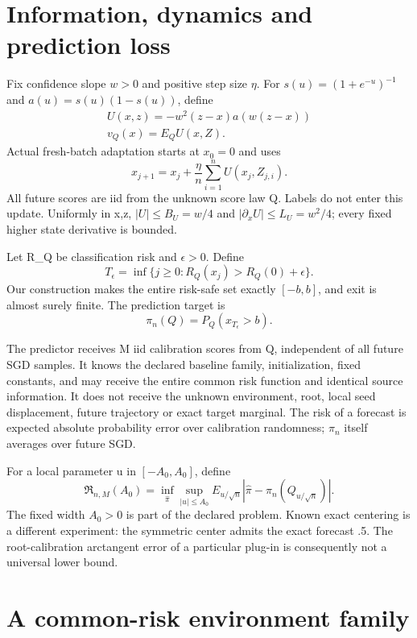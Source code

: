 \section{Information, dynamics and prediction loss}\label{information-dynamics-and-prediction-loss}

Fix confidence slope \(w>0\) and positive step size \(\eta\). For \(s(u)=(1+e^{-u})^{-1}\) and \(a(u)=s(u)(1-s(u))\), define
\[
\begin{gathered}
U(x,z)=-w^2(z-x)a(w(z-x)) \\
v_Q(x)=E_Q U(x,Z).
\end{gathered}
\]
Actual fresh-batch adaptation starts at \(x_0=0\) and uses
\[
x_{j+1}=x_j+\frac\eta n\sum_{i=1}^n U(x_j,Z_{j,i}).
\]
All future scores are iid from the unknown score law Q. Labels do not enter this update. Uniformly in x,z, \(|U|\le B_U=w/4\) and \(|\partial_x U|\le L_U=w^2/4\); every fixed higher state derivative is bounded.

Let R\_Q be classification risk and \(\epsilon>0\). Define
\[
T_\epsilon=\inf\{j\ge0:R_Q(x_j)>R_Q(0)+\epsilon\}.
\]
Our construction makes the entire risk-safe set exactly \([-b,b]\), and exit is almost surely finite. The prediction target is
\[
\pi_n(Q)=P_Q(x_{T_\epsilon}>b).
\]

The predictor receives M iid calibration scores from Q, independent of all future SGD samples. It knows the declared baseline family, initialization, fixed constants, and may receive the entire common risk function and identical source information. It does not receive the unknown environment, root, local seed displacement, future trajectory or exact target marginal. The risk of a forecast is expected absolute probability error over calibration randomness; \(\pi_n\) itself averages over future SGD.

For a local parameter u in \([-A_0,A_0]\), define
\[
\mathfrak R_{n,M}(A_0)=\inf_{\widehat\pi}\sup_{|u|\le A_0}
 E_{u/\sqrt n}|\widehat\pi-\pi_n(Q_{u/\sqrt n})|.
\]
The fixed width \(A_0>0\) is part of the declared problem. Known exact centering is a different experiment: the symmetric center admits the exact forecast .5. The root-calibration arctangent error of a particular plug-in is consequently not a universal lower bound.

\section{A common-risk environment family}\label{a-common-risk-environment-family}

